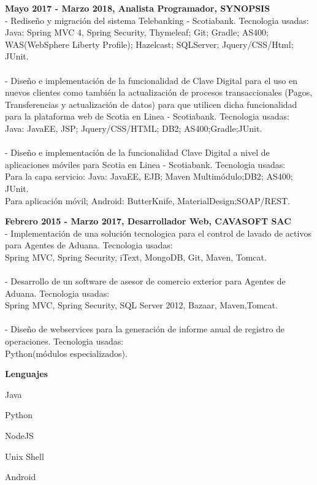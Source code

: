 \documentclass[a4paper,12pt,final]{memoir}
\newcommand{\SmallSep}{\vspace{0.5em}}
\newcommand{\CVSection}[1]
	{\Large\textbf{#1}\par
	\SmallSep\normalsize\normalfont}
\newcommand{\CVItem}[1]
	{\textbf{\color{RoyalBlue} #1}}
\begin{document}
\CVItem{Mayo 2017 - Marzo 2018, Analista Programador, SYNOPSIS}\\
- Rediseño y migración del sistema Telebanking - Scotiabank. Tecnologia usadas:\\
Java: Spring MVC 4, Spring Security, Thymeleaf; Git; Gradle; AS400; WAS(WebSphere Liberty Profile); Hazelcast; SQLServer; Jquery/CSS/Html; JUnit.\\\\
- Diseño e implementación de la funcionalidad de Clave Digital para el uso en nuevos clientes como también la actualización de procesos transaccionales (Pagos, Transferencias y actualización de datos) para que utilicen dicha funcionalidad para la plataforma web de Scotia en Linea - Scotiabank. Tecnologia usadas:\\
Java: JavaEE, JSP; Jquery/CSS/HTML; DB2; AS400;Gradle;JUnit.\\\\
- Diseño e implementación de la funcionalidad Clave Digital a nivel de aplicaciones móviles para Scotia en Linea - Scotiabank. Tecnologia usadas:\\
Para la capa servicio: Java: JavaEE, EJB; Maven Multimódulo;DB2; AS400; JUnit.\\
Para aplicación móvil; Android: ButterKnife, MaterialDesign;SOAP/REST.
\SmallSep

\CVItem{Febrero 2015 - Marzo 2017, Desarrollador Web, CAVASOFT SAC}\\
- Implementación de una solución tecnologica para el control de lavado de activos para Agentes de Aduana. Tecnologia usadas:\\
Spring MVC, Spring Security, iText, MongoDB, Git, Maven, Tomcat.\\\\
- Desarrollo de un software de asesor de comercio exterior para Agentes de Aduana. Tecnologia usadas:\\
Spring MVC, Spring Security, SQL Server 2012, Bazaar, Maven,Tomcat.\\\\
- Diseño de webservices para la generación de informe anual de registro de operaciones. Tecnologia usadas:\\
Python(módulos especializados).
\SmallSep

\CVSection{Lenguajes}
\begin{multicols}{3}
\begin{compactitem}[\color{RoyalBlue}$\circ$]
	\item Java
	\item Python
	\item NodeJS
	\item Unix Shell
	\item Android
\end{compactitem}
\end{multicols}
\SmallSep
\end{document}
